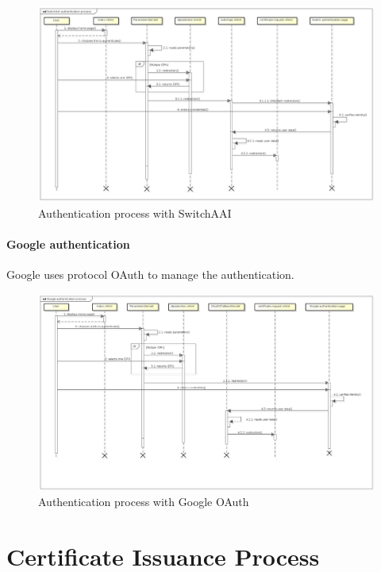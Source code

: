 \documentclass[oneside]{scrreprt}
\begin{document}
\begin{figure}[ht]
\centerline{
\includegraphics[width=1.0\textwidth]{figs/authentication_process_switch}}
\caption{Authentication process with SwitchAAI}
\label{fig:auth_process_switch}
\end{figure}

\paragraph*{Google authentication} Google uses protocol OAuth to manage the authentication.
\begin{figure}[ht]
\centerline{
\includegraphics[width=1.0\textwidth]{figs/authentication_process_google}}
\caption{Authentication process with Google OAuth}
\label{fig:auth_process_google}
\end{figure}

\section{Certificate Issuance Process}
\end{document}
